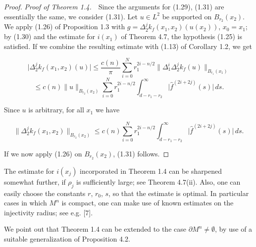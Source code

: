 \begin{proof}
\textit{Proof of Theorem 1.4.}\ \ Since the arguments for (1.29), (1.31) are
essentially the same, we consider (1.31). Let $u \in L^2$ be supported on
$B_{r_2}(x_2)$. We apply (1.26) of Proposition 1.3 with
$g = \Delta_2^j k_f(x_1,x_2)(u(x_2))$, $x_0 = x_1$; by (1.30) and the estimate
for $i(x_1)$ of Theorem 4.7, the hypothesis (1.25) is satisfied. If we combine
the resulting estimate with (1.13) of Corollary 1.2, we get

\begin{equation}\tag{1.32}
\bigl|\Delta_2^j k_f(x_1,x_2)(u)\bigr| \leq \frac{c(n)}{\pi}\sum_{i=0}^N r_1^{2i-n/2}
\bigl\|\Delta_1^i \Delta_2^j k_f(u)\bigr\|_{B_{r_1}(x_1)}
\end{equation}
\[
\leq c(n)\|u\|_{B_{r_2}(x_2)} \sum_{i=0}^N r_1^{2i-n/2}
\int_{d-r_1-r_2}^\infty \bigl|\hat f^{(2i+2j)}(s)\bigr|\,ds.
\]

Since $u$ is arbitrary, for all $x_1$ we have

\begin{equation}\tag{1.33}
\bigl\|\Delta_2^j k_f(x_1,x_2)\bigr\|_{B_{r_2}(x_2)}
\leq c(n)\sum_{i=0}^N r_1^{2i-n/2} \int_{d-r_1-r_2}^\infty \bigl|\hat f^{(2i+2j)}(s)\bigr|\,ds.
\end{equation}

If we now apply (1.26) on $B_{r_2}(x_2)$, (1.31) follows.
\end{proof}

\begin{remark}
\label{rem:sectional-curvature-kernel-estimate}
The estimate for $i(x_j)$ incorporated in Theorem 1.4 can be sharpened
somewhat further, if $\rho_j$ is sufficiently large; see Theorem 4.7(ii). Also,
one can easily choose the constants $r$, $r_0$, $s$, so that the estimate is
optimal. In particular cases in which $M^n$ is compact, one can make use of
known estimates on the injectivity radius; see e.g. [7].
\end{remark}

We point out that Theorem 1.4 can be extended to the case $\partial M^n \neq \emptyset$, by
use of a suitable generalization of Proposition 4.2.
